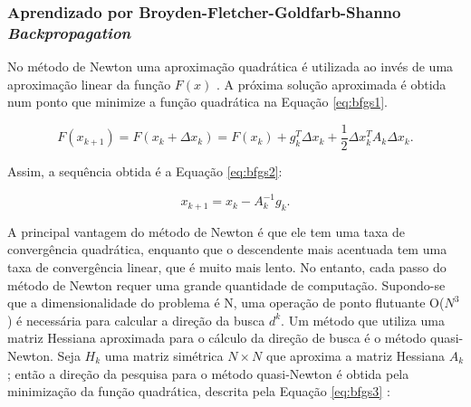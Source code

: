 \subsubsection{Aprendizado por Broyden-Fletcher-Goldfarb-Shanno \textit{Backpropagation}}

No método de Newton uma aproximação quadrática é utilizada ao invés de uma aproximação linear da função $F(x)$ \label{symbol:funcaominimizacaoBFGS}. A próxima solução aproximada é obtida num ponto que minimize a função quadrática na Equação \ref{eq:bfgs1}.

\begin{equation}
\label{eq:bfgs1}
F(x_{k+1}) = F(x_k + \Delta x_k) = F(x_{k})+ g^T_k\Delta x_k + \frac{1}{2}\Delta x^T_k A_k \Delta x_k.
\end{equation}

Assim, a sequência obtida é a Equação \ref{eq:bfgs2}:

\begin{equation}
\label{eq:bfgs2}
x_{k+1} = x_k - A^{-1}_k g_k .
\end{equation}

A principal vantagem do método de Newton é que ele tem uma taxa de convergência quadrática, enquanto que o descendente mais acentuada tem uma taxa de convergência linear, que é muito mais lento. No entanto, cada passo do método de Newton requer uma grande quantidade de computação. Supondo-se que a dimensionalidade do problema é N, uma operação de ponto flutuante O($N^3$) é necessária para calcular a direção da busca $d^k$.  Um método que utiliza uma matriz Hessiana aproximada para o cálculo da direção de busca é o método quasi-Newton. Seja  $H_k$ uma matriz simétrica $N \times N$ que aproxima a matriz Hessiana $A_k$; então a direção da pesquisa para o método quasi-Newton é obtida pela minimização da função quadrática, descrita pela Equação \ref{eq:bfgs3} \cite{saini2002artificial}:

